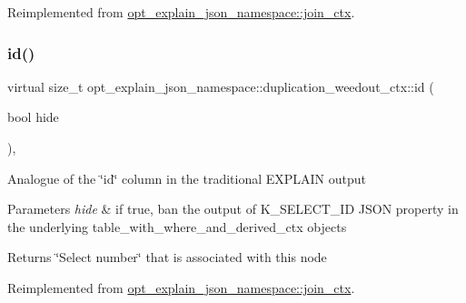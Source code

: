 Reimplemented from \mbox{\hyperlink{classopt__explain__json__namespace_1_1join__ctx_a83f0f4dde495c7ca7063692cbfbefbdf}{opt\+\_\+explain\+\_\+json\+\_\+namespace\+::join\+\_\+ctx}}.

\mbox{\label{classopt__explain__json__namespace_1_1duplication__weedout__ctx_ac1df854f614e849880a6449f5c92a98b}} 
\subsubsection{\texorpdfstring{id()}{id()}}
{\footnotesize\ttfamily virtual size\+\_\+t opt\+\_\+explain\+\_\+json\+\_\+namespace\+::duplication\+\_\+weedout\+\_\+ctx\+::id (\begin{DoxyParamCaption}\item[{bool}]{hide }\end{DoxyParamCaption})\hspace{0.3cm}{\ttfamily [inline]}, {\ttfamily [virtual]}}

Analogue of the \char`\"{}id\char`\"{} column in the traditional E\+X\+P\+L\+A\+IN output


\begin{DoxyParams}{Parameters}
{\em hide} & if true, ban the output of K\+\_\+\+S\+E\+L\+E\+C\+T\+\_\+\+ID J\+S\+ON property in the underlying table\+\_\+with\+\_\+where\+\_\+and\+\_\+derived\+\_\+ctx objects\\
\hline
\end{DoxyParams}
\begin{DoxyReturn}{Returns}
\char`\"{}\+Select number\char`\"{} that is associated with this node 
\end{DoxyReturn}


Reimplemented from \mbox{\hyperlink{classopt__explain__json__namespace_1_1join__ctx_ab5a53a0661e15a3cfca73c0209038945}{opt\+\_\+explain\+\_\+json\+\_\+namespace\+::join\+\_\+ctx}}.

\mbox{\label{classopt__explain__json__namespace_1_1duplication__weedout__ctx_abddc44a12584e636196cbceec61862dd}} 
